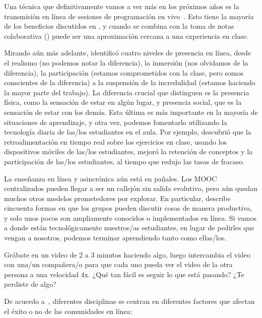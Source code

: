 Una técnica que definitivamente vamos a ver más en los próximos años es
la transmisión en línea de sesiones de programación en vivo~\cite{Raj2018,Haar2017}.
Esto tiene la mayoría de los beneficios discutidos en ,
y cuando se combina con la toma de notas colaborativa ()
puede ser una aproximación cercana a una experiencia en clase.

Mirando aún más adelante,
\cite{Ijss2000} identificó cuatro niveles de presencia en línea,
desde el realismo (no podemos notar la diferencia),
la inmersión (nos olvidamos de la diferencia),
la participación (estamos comprometidos con la clase, pero somos conscientes de la diferencia)
a la suspensión de la incredulidad (estamos haciendo la mayor parte del trabajo).
La diferencia crucial que distinguen es
la presencia física, como
la sensación de estar en algún lugar,
y presencia social, que es la sensación de estar con los demás.
Esta última es más importante en la mayoría de situaciones de aprendizaje,
y otra vez,
podemos fomentarlo utilizando la tecnología diaria de las/los estudiantes en el aula.
Por ejemplo,
\cite{Deb2018} descubrió que la retroalimentación en tiempo real sobre los ejercicios en clase,
usando los dispositivos móviles de las/los estudiantes, mejoró la retención de conceptos y
la participación de las/los estudiantes, al tiempo que redujo las tasas de fracaso.

La enseñanza en línea y asincrónica aún está en pañales.
Los MOOC centralizados pueden llegar a ser un callejón sin salida evolutivo,
pero aún quedan muchos otros modelos prometedores por explorar.
En particular,
\cite{Broo2016} describe cincuenta formas en que los grupos pueden discutir cosas de manera productiva,
y solo unos pocos son ampliamente conocidos o implementados en línea.
Si vamos a donde están tecnológicamente nuestros/as estudiantes,
en lugar de pedirles que vengan a nosotros,
podemos terminar aprendiendo tanto como ellas/los.



Grábate en un video de 2 a 3 minutos haciendo algo,
luego intercambia el video con una/un compañera/o
para que cada uno pueda ver el video de la otra persona a una velocidad 4x.
¿Qué tan fácil es seguir lo que está pasando?
¿Te perdiste de algo?


De acuerdo a~\cite{Irib2009},
diferentes disciplinas se centran en diferentes factores
que afectan el éxito o no de las comunidades en línea:

